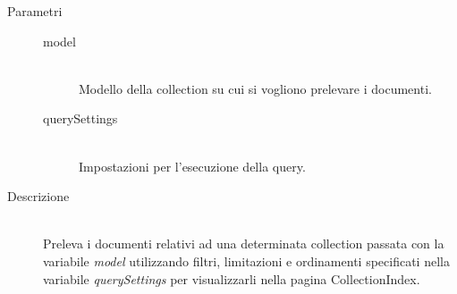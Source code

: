 \begin{description}
\begin{mldescription}
 \hfill 
				\begin{description}
					\item[Parametri] \hfill
						\begin{description}	
						\item[model] \hfill \\
						Modello della collection su cui si vogliono prelevare i documenti.
						\item[querySettings] \hfill \\
						Impostazioni per l'esecuzione della query.
						\end{description}
					\item[Descrizione] \hfill \\
	Preleva i documenti relativi ad una determinata collection passata con la variabile \textit{model} utilizzando filtri, limitazioni e ordinamenti specificati nella variabile \textit{querySettings} per visualizzarli nella pagina CollectionIndex.
					
				\end{description}
	

\end{mldescription}
\end{description}
